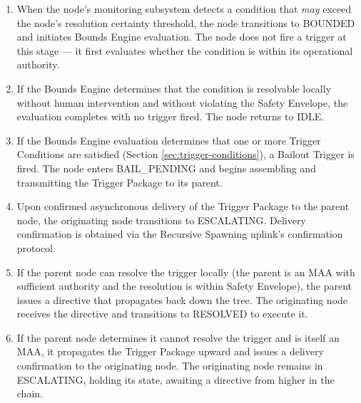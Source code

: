 \begin{enumerate}
  \item[\textbf{$T(\text{IDLE}, \text{EVALUATE}) = \text{BOUNDED}$}] When the node's monitoring subsystem detects a condition that \emph{may} exceed the node's resolution certainty threshold, the node transitions to BOUNDED and initiates Bounds Engine evaluation. The node does not fire a trigger at this stage — it first evaluates whether the condition is within its operational authority.

  \item[\textbf{$T(\text{BOUNDED}, \text{LOCAL\_RESOLUTION\_FOUND}) = \text{IDLE}$}] If the Bounds Engine determines that the condition is resolvable locally without human intervention and without violating the Safety Envelope, the evaluation completes with no trigger fired. The node returns to IDLE.

  \item[\textbf{$T(\text{BOUNDED}, \text{TRIGGER\_CONDITION\_MET}) = \text{BAIL\_PENDING}$}] If the Bounds Engine evaluation determines that one or more Trigger Conditions are satisfied (Section \ref{sec:trigger-conditions}), a Bailout Trigger is fired. The node enters BAIL\_PENDING and begins assembling and transmitting the Trigger Package to its parent.

  \item[\textbf{$T(\text{BAIL\_PENDING}, \text{PACKAGE\_TRANSMITTED}) = \text{ESCALATING}$}] Upon confirmed asynchronous delivery of the Trigger Package to the parent node, the originating node transitions to ESCALATING. Delivery confirmation is obtained via the Recursive Spawning uplink's confirmation protocol.

  \item[\textbf{$T(\text{ESCALATING}, \text{LOCAL\_RESOLUTION\_RECEIVED}) = \text{RESOLVED}$}] If the parent node can resolve the trigger locally (the parent is an MAA with sufficient authority and the resolution is within Safety Envelope), the parent issues a directive that propagates back down the tree. The originating node receives the directive and transitions to RESOLVED to execute it.

  \item[\textbf{$T(\text{ESCALATING}, \text{ESCALATED\_UPWARD}) = \text{ESCALATING}$}] If the parent node determines it cannot resolve the trigger and is itself an MAA, it propagates the Trigger Package upward and issues a delivery confirmation to the originating node. The originating node remains in ESCALATING, holding its state, awaiting a directive from higher in the chain.


\end{enumerate}
